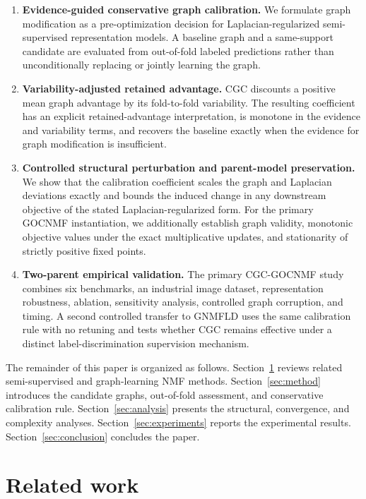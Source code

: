 \documentclass[11pt]{article}
\theoremstyle{remark}
\begin{document}
\begin{enumerate}[leftmargin=2em]
\item \textbf{Evidence-guided conservative graph calibration.} We formulate graph modification as a pre-optimization decision for Laplacian-regularized semi-supervised representation models. A baseline graph and a same-support candidate are evaluated from out-of-fold labeled predictions rather than unconditionally replacing or jointly learning the graph.

\item \textbf{Variability-adjusted retained advantage.} CGC discounts a positive mean graph advantage by its fold-to-fold variability. The resulting coefficient has an explicit retained-advantage interpretation, is monotone in the evidence and variability terms, and recovers the baseline exactly when the evidence for graph modification is insufficient.

\item \textbf{Controlled structural perturbation and parent-model preservation.} We show that the calibration coefficient scales the graph and Laplacian deviations exactly and bounds the induced change in any downstream objective of the stated Laplacian-regularized form. For the primary GOCNMF instantiation, we additionally establish graph validity, monotonic objective values under the exact multiplicative updates, and stationarity of strictly positive fixed points.

\item \textbf{Two-parent empirical validation.} The primary CGC-GOCNMF study combines six benchmarks, an industrial image dataset, representation robustness, ablation, sensitivity analysis, controlled graph corruption, and timing. A second controlled transfer to GNMFLD uses the same calibration rule with no retuning and tests whether CGC remains effective under a distinct label-discrimination supervision mechanism.
\end{enumerate}

The remainder of this paper is organized as follows. Section~\ref{sec:related} reviews related semi-supervised and graph-learning NMF methods. Section~\ref{sec:method} introduces the candidate graphs, out-of-fold assessment, and conservative calibration rule. Section~\ref{sec:analysis} presents the structural, convergence, and complexity analyses. Section~\ref{sec:experiments} reports the experimental results. Section~\ref{sec:conclusion} concludes the paper.

\section{Related work}
\label{sec:related}
\end{document}
